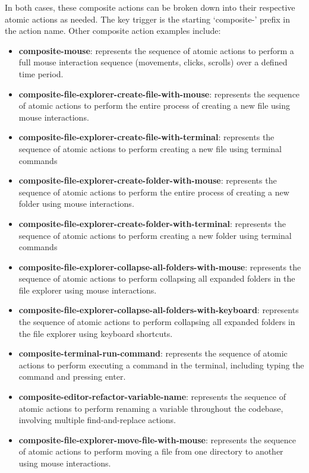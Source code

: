 \documentclass[11pt, a4paper]{article}
\begin{document}
In both cases, these composite actions can be broken down into their respective atomic actions as needed. The key trigger is the starting `composite-' prefix in the action name. Other composite action examples include:

\begin{itemize}
    \item \textbf{composite-mouse}: represents the sequence of atomic actions to perform a full mouse interaction sequence (movements, clicks, scrolls) over a defined time period.
    \item \textbf{composite-file-explorer-create-file-with-mouse}: represents the sequence of atomic actions to perform the entire process of creating a new file using mouse interactions.
    \item \textbf{composite-file-explorer-create-file-with-terminal}: represents the sequence of atomic actions to perform creating a new file using terminal commands
    \item \textbf{composite-file-explorer-create-folder-with-mouse}: represents the sequence of atomic actions to perform the entire process of creating a new folder using mouse interactions.
    \item \textbf{composite-file-explorer-create-folder-with-terminal}: represents the sequence of atomic actions to perform creating a new folder using terminal commands
    \item \textbf{composite-file-explorer-collapse-all-folders-with-mouse}: represents the sequence of atomic actions to perform collapsing all expanded folders in the file explorer using mouse interactions.
    \item \textbf{composite-file-explorer-collapse-all-folders-with-keyboard}: represents the sequence of atomic actions to perform collapsing all expanded folders in the file explorer using keyboard shortcuts.
    \item \textbf{composite-terminal-run-command}: represents the sequence of atomic actions to perform executing a command in the terminal, including typing the command and pressing enter.
    \item \textbf{composite-editor-refactor-variable-name}: represents the sequence of atomic actions to perform renaming a variable throughout the codebase, involving multiple find-and-replace actions.
    \item \textbf{composite-file-explorer-move-file-with-mouse}: represents the sequence of atomic actions to perform moving a file from one directory to another using mouse interactions.

\end{itemize}
\end{document}
